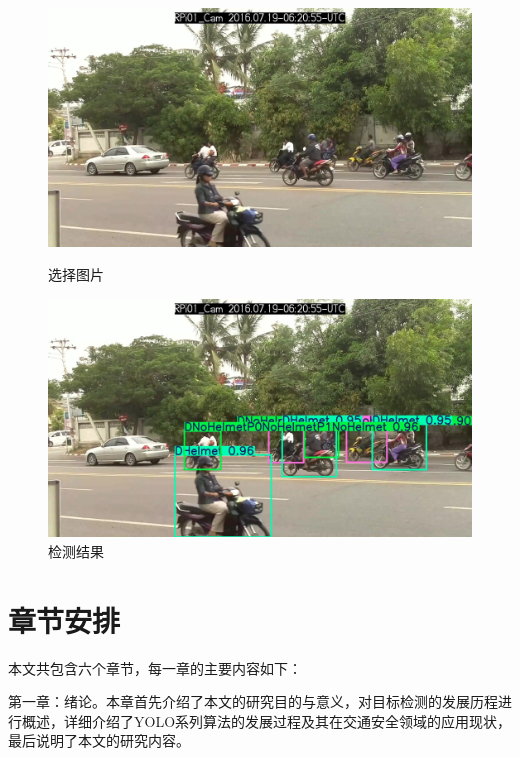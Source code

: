 \begin{figure}[!htb]
  \centering
  \begin{minipage}{0.45\textwidth} %
      \centering
      \includegraphics[width=\textwidth]{figs/chap01/source.jpg}
      \caption{选择图片}
      \label{fig:source}
  \end{minipage}
  \hfill %
  \begin{minipage}{0.45\textwidth}
      \centering
      \includegraphics[width=\textwidth]{figs/chap01/result.png}
      \caption{检测结果}
      \label{fig:result}
  \end{minipage}
\end{figure}


\section{章节安排}
本文共包含六个章节，每一章的主要内容如下：

第一章：绪论。本章首先介绍了本文的研究目的与意义，对目标检测的发展历程进行概述，详细介绍了YOLO系列算法的发展过程及其在交通安全领域的应用现状，最后说明了本文的研究内容。

